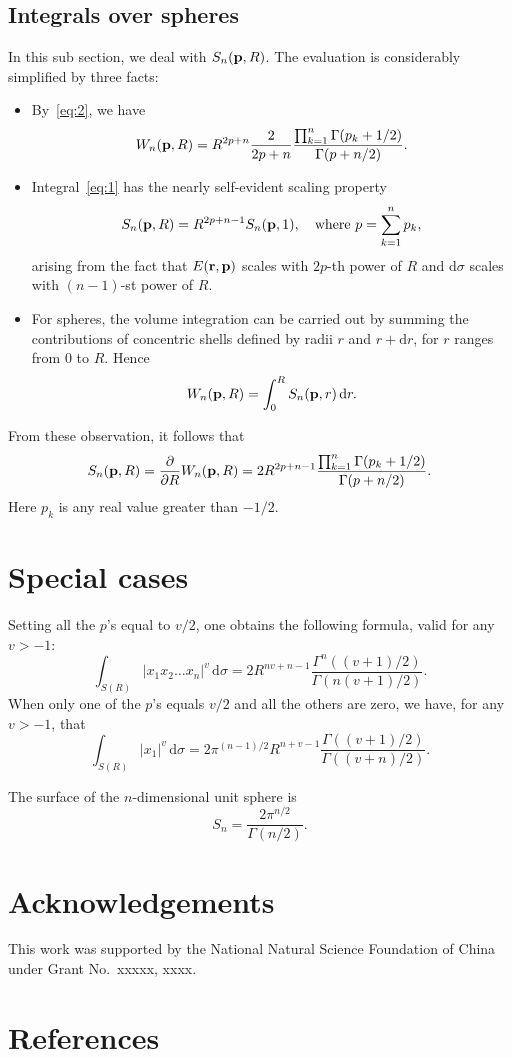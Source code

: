 \documentclass[11pt, letterpaper]{article}
\theoremstyle{plain}
\theoremstyle{definition}
\theoremstyle{remark}
\begin{document}
\subsection{Integrals over spheres}
In this sub section, we deal with $S_n(\mathbf{p},R)$.
The evaluation is considerably simplified by three facts:
\begin{itemize}
    \item
By~\eqref{eq:2}, we have
\begin{equation}
    W_n(\mathbf{p},R)=R^{2p+n}\frac{2}{2p+n}\frac{\prod_{k=1}^n \Gamma(p_k+1/2)}{\Gamma(p+{n}/{2})}.
\end{equation}
\item
Integral~\eqref{eq:1} has the nearly self-evident scaling property
$$
S_n(\mathbf{p},R)= R^{2p+n-1}S_n(\mathbf{p},1),\quad \text{where $p=\sum_{k=1}^n p_k$},
$$
arising from the fact that $E(\mathbf{r},\mathbf{p})$ scales with $2p$-th power of $R$ and $\text{d}\sigma$ scales with $(n-1)$-st power of $R$.
\item
    For spheres, the volume integration can be carried out by summing the contributions of concentric shells defined by radii $r$ and $r+\mathrm{d}r$, for $r$ ranges from $0$ to $R$. Hence
$$
        W_n(\mathbf{p},R)=\int_0^R S_n(\mathbf{p},r)\, \mathrm{d}r.
$$
\end{itemize}

From these observation, it follows that
$$
S_n(\mathbf{p},R)=\frac{\partial}{\partial R} W_n(\mathbf{p},R)=2R^{2p+n-1}\frac{\prod_{k=1}^n \Gamma(p_k+1/2)}{\Gamma(p+n/2)}.
$$
Here $p_k$ is any real value greater than $-1/2$.
\section{Special cases}
Setting all the $p$'s equal to $v/2$, one obtains the following formula, valid for any $v>-1$:
$$
\int_{S(R)}|x_1 x_2 \ldots x_n|^v\,\mathrm{d}\sigma=2 R^{nv+n-1}\frac{\Gamma^n((v+1)/2)}{\Gamma(n(v+1)/2)}.
$$
When only one of  the $p$'s equals $v/2$ and all  the others are zero, we have, for any $v>-1$, that
$$
\int_{S(R)}|x_1|^v\, \mathrm{d}\sigma=2\pi^{(n-1)/2}R^{n+v-1}\frac{\Gamma((v+1)/2)}{\Gamma((v+n)/2)}.
$$

The surface of the $n$-dimensional unit sphere is
$$
S_n=\frac{2\pi^{n/2}}{\Gamma(n/2)}.
$$


\section*{Acknowledgements}
This work was supported by the National Natural Science Foundation of China under Grant No.\ xxxxx, xxxx.


\section*{References}



\end{document}

